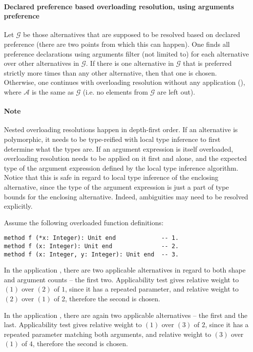 \paragraph{Declared preference based overloading resolution, using arguments preference}
Let $\mathcal{G}$ be those alternatives that are supposed to be resolved based on declared preference (there are two points from which this can happen). One finds all preference declarations using arguments filter (not limited to) for each alternative over other alternatives in $\mathcal{G}$. If there is one alternative in $\mathcal{G}$ that is preferred strictly more times than any other alternative, then that one is chosen. Otherwise, one continues with overloading resolution without any application (), where $\mathcal{A}$ is the same as $\mathcal{G}$ (i.e. no elements from $\mathcal{G}$ are left out). 

\paragraph{Note}
Nested overloading resolutions happen in depth-first order. If an alternative is polymorphic, it needs to be type-reified with local type inference to first determine what the types are. If an argument expression is itself overloaded, overloading resolution needs to be applied on it first and alone, and the expected type of the argument expression defined by the local type inference algorithm. Notice that this is safe in regard to local type inference of the enclosing alternative, since the type of the argument expression is just a part of type bounds for the enclosing alternative. Indeed, ambiguities may need to be resolved explicitly. 

\example Assume the following overloaded function definitions:
\begin{lstlisting}
method f (*x: Integer): Unit end             -- 1.
method f (x: Integer): Unit end              -- 2.
method f (x: Integer, y: Integer): Unit end  -- 3.
\end{lstlisting}

In the application , there are two applicable alternatives in regard to both shape and argument counts -- the first two. Applicability test gives relative weight to $(1)$ over $(2)$ of $1$, since it has a repeated parameter, and relative weight to $(2)$ over $(1)$ of 2, therefore the second is chosen. 

In the application , there are again two applicable alternatives -- the first and the last. Applicability test gives relative weight to $(1)$ over $(3)$ of $2$, since it has a repeated parameter matching both arguments, and relative weight to $(3)$ over $(1)$ of $4$, therefore the second is chosen. 

